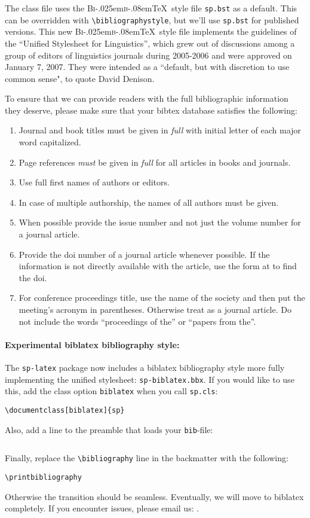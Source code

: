 \documentclass[lucida,final]{sp}
\newcommand{\BibTeX}{B{\textsc i\kern-.025em\textsc b}\kern-.08em\TeX}
\newcommand{\spfile}[1]{\texttt{#1}}
\newcommand{\cmd}[1]{\texttt{\textbackslash#1}}
\begin{document}
The class file uses the \BibTeX\ style file \spfile{sp.bst} as a
default.  This can be overridden with \cmd{bibliographystyle}, but
we'll use \spfile{sp.bst} for published versions. This new \BibTeX\
style file implements the guidelines of the ``Unified Stylesheet for
Linguistics'', which grew out of discussions among a group of editors
of linguistics journals during 2005-2006 and were approved on January
7, 2007. They were intended as a ``default, but with discretion to use
common sense", to quote David Denison.

To ensure that we can provide readers with the full bibliographic
information they deserve, please make sure that your bibtex database
satisfies the following:

\begin{enumerate}
\item Journal and book titles must be given in \emph{full} with initial
    letter of each major word capitalized.
\item Page references \emph{must} be given in \emph{full} for all
  articles in books and journals.
\item Use full first names of authors or editors.
\item In case of multiple authorship, the names of all authors must be
  given.
\item When possible provide the issue number and not just the volume
  number for a journal article.
\item Provide the doi number of a journal article whenever
  possible. If the information is not directly available with the
  article, use the form at
   to find the doi.
\item For conference proceedings title, use the name of the society
      and then put the meeting's acronym in parentheses. Otherwise treat
      as a journal article. Do not include the words ``proceedings of
      the'' or ``papers from the''.

\end{enumerate}

\paragraph{Experimental biblatex bibliography style:}
%
The \texttt{sp-latex} package now includes a biblatex bibliography style
more fully implementing the unified stylesheet:
\texttt{sp-biblatex.bbx}. If you would like to use this, add the class
option \texttt{biblatex} when you call \texttt{sp.cls}:
%
\begin{Verbatim}
\documentclass[biblatex]{sp}
\end{Verbatim}
%
Also, add a line to the preamble that loads your \spfile{bib}-file:
%
\begin{Verbatim}

\end{Verbatim}
%
Finally, replace the \cmd{bibliography} line in the backmatter with the
following:
%
\begin{Verbatim}
\printbibliography
\end{Verbatim}
%
Otherwise the transition should be seamless. Eventually, we will move to
biblatex completely. If you encounter issues, please email us:
.
\end{document}
